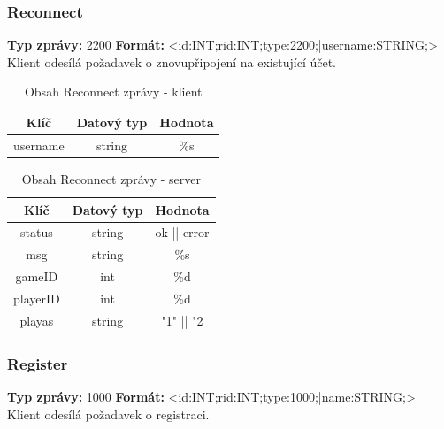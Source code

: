\documentclass[12pt, a4paper]{article}
\begin{document}
\subsubsection{Reconnect}
\textbf{Typ zprávy: } 2200 \newline
\textbf{Formát: } \newline  <id:INT;rid:INT;type:2200;|username:STRING;> \newline
Klient odesílá požadavek o znovupřipojení na existující účet. \newline

    \begin{table}[H]
        \centering
        \begin{tabular}{|c|c|c|}
            \hline
            Klíč & Datový typ & Hodnota \\
            \hline
            \hline
            username & string & \%s \\
            \hline
        \end{tabular}
        \caption{Obsah Reconnect zprávy - klient}
    \end{table}

    \begin{table}[H]
        \centering
        \begin{tabular}{|c|c|c|}
            \hline
            Klíč & Datový typ & Hodnota \\
            \hline
            \hline
            status & string & ok || error \\
            \hline
            msg & string & \%s \\
            \hline
            gameID & int & \%d \\
            \hline
            playerID & int & \%d \\
            \hline
            playas & string & "1" || "2 \\
            \hline
        \end{tabular}
        \caption{Obsah Reconnect zprávy - server}
    \end{table}

\subsubsection{Register}
\textbf{Typ zprávy: } 1000 \newline
\textbf{Formát: } \newline  <id:INT;rid:INT;type:1000;|name:STRING;> \newline
Klient odesílá požadavek o registraci. \newline
\end{document}

